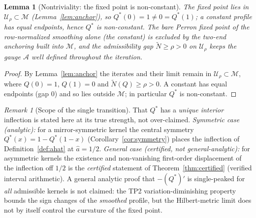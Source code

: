 \documentclass[11pt]{article}
\theoremstyle{plain}
\newtheorem{lemma}[theorem]{Lemma}
\theoremstyle{definition}
\theoremstyle{remark}
\newtheorem{remark}[theorem]{Remark}
\newcommand{\Ac}{\mathcal A}
\begin{document}
\begin{lemma}[Nontriviality: the fixed point is non-constant]\label{lem:nontrivial}
The fixed point lies in $\mathcal U_\rho\subset\mathcal M$ (Lemma~\ref{lem:anchor}), so $Q^*(0)=1\neq0=Q^*(1)$; a constant profile has equal endpoints, hence $Q^*$ is non-constant. The bare Perron fixed point of the row-normalized smoothing alone (the constant) is excluded by the two-end anchoring built into $\mathcal M$, and the admissibility gap $\tilde N\ge\rho>0$ on $\mathcal U_\rho$ keeps the gauge $\Ac$ well defined throughout the iteration.
\end{lemma}
\begin{proof}
By Lemma~\ref{lem:anchor} the iterates and their limit remain in $\mathcal U_\rho\subset\mathcal M$, where $Q(0)=1$, $Q(1)=0$ and $\tilde N(Q)\ge\rho>0$. A constant has equal endpoints (gap $0$) and so lies outside $\mathcal M$; in particular $Q^*$ is non-constant.
\end{proof}

\begin{remark}[Scope of the single transition]\label{rem:singletransition}
That $Q^*$ has a \emph{unique interior} inflection is stated here at its true strength, not over-claimed. \emph{Symmetric case (analytic):} for a mirror-symmetric kernel the central symmetry $Q^*(x)=1-Q^*(1-x)$ (Corollary~\ref{cor:symmetry}) places the inflection of Definition~\ref{def:ahat} at $\hat a=1/2$. \emph{General case (certified, not general-analytic):} for asymmetric kernels the existence and non-vanishing first-order displacement of the inflection off $1/2$ is the \emph{certified} statement of Theorem~\ref{thm:certified} (verified interval arithmetic). A general analytic proof that $-(Q^*)'$ is single-peaked for \emph{all} admissible kernels is not claimed: the TP2 variation-diminishing property \citep{karlin1968} bounds the sign changes of the \emph{smoothed} profile, but the Hilbert-metric limit does not by itself control the curvature of the fixed point.
\end{remark}
\end{document}
